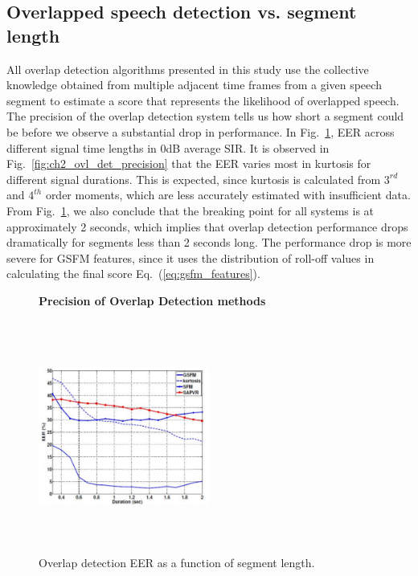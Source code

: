 {\subsection{Overlapped speech detection vs. segment length}
\label{sssec:ovl_frame_vs_seg_gsfm}
All overlap detection algorithms presented in this study use the collective knowledge obtained from multiple adjacent time frames from a given speech segment to estimate a score that represents the likelihood of overlapped speech. 
The precision of the overlap detection system tells us how short a segment could be before we observe a substantial drop in performance. 
In Fig.~\ref{fig:ch2_ovl_det_precision_gsfm}, EER across different signal time lengths in 0dB average SIR. 
It is observed in Fig.~\ref{fig:ch2_ovl_det_precision} that the EER varies most in kurtosis for different signal durations. 
This is expected, since kurtosis is calculated from $3^{rd}$ and $4^{th}$ order moments, which are less accurately estimated with insufficient data. 
From Fig.~\ref{fig:ch2_ovl_det_precision_gsfm}, we also conclude that the breaking point for all systems is at approximately 2 seconds, which implies that overlap detection performance drops dramatically for segments less than 2 seconds long. 
The performance drop is more severe for GSFM features, since it uses the distribution of roll-off values in calculating the final score Eq.~(\ref{eq:gsfm_features}). 

\begin{figure}[h!]
	\centering
	\hspace{-1mm}
	\textbf{Precision of Overlap Detection methods}\par\medskip
	\includegraphics[height = 3in, width=0.5\textwidth]{figures/eer_vs_time_gsfm}
	\vspace{-1mm}
	\caption{ Overlap detection EER as a function of segment length. }
	\vspace{0mm}
	\label{fig:ch2_ovl_det_precision_gsfm}
\end{figure}

}
